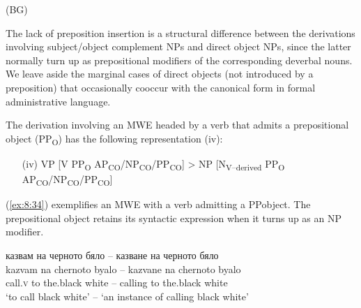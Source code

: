 \documentclass[output=paper]{langsci/langscibook}
\begin{document}
\noindent\begin{minipage}[t]{\linewidth-3em}%
\begin{exe}
\end{exe}
\end{minipage}%
\hfill
\noindent\begin{minipage}[t]{2em}%
\vspace*{0.15\baselineskip}
(BG)
\end{minipage}

The lack of preposition insertion is a structural difference between the
derivations involving subject/object complement NPs and direct object
NPs, since the latter normally turn up as prepositional modifiers of the
corresponding deverbal nouns. We leave aside the marginal cases of
direct objects (not introduced by a preposition) that occasionally
co\textendash occur with the canonical form in formal administrative language. 



The derivation involving an MWE headed by a verb that admits a
prepositional object (PP\textsubscript{O}) has the following
representation (iv):

\renewcommand{\theenumi}{(\roman{enumi})}%
\begin{enumerate}
 \setcounter{enumi}{3}
 \item[(iv)] VP [V PP\textsubscript{O}
AP\textsubscript{CO}/NP\textsubscript{CO}/PP\textsubscript{CO}] > NP
[N\textsubscript{V–derived} PP\textsubscript{O}
AP\textsubscript{CO}/NP\textsubscript{CO}/PP\textsubscript{CO}]
\end{enumerate}

(\ref{ex:8:34}) exemplifies an MWE with a verb admitting a PP\textendash object. The
prepositional object retains its syntactic expression when it turns up
as an NP modifier.


\begin{exe}
\ex \label{ex:8:34}
\settowidth{}
\glll казвам на черното бяло -- казване на черното бяло\\
kazvam na chernoto byalo -- kazvane na chernoto byalo\\ 
call.\textsc{v} to the.black white -- calling to the.black white \\ 
\glt ‘to call black white’ -- ‘an instance of calling black white’ 
\end{exe}
\end{document}
